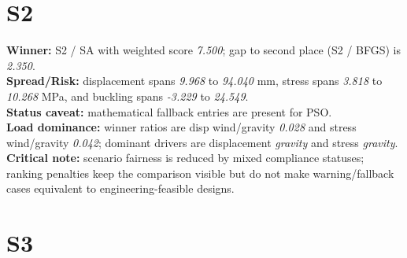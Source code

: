 \section{S2}


\begin{table}[H]
\centering
\scriptsize
\setlength{\tabcolsep}{4pt}
\renewcommand{\arraystretch}{1.1}
\end{table}


\begin{samepage}
\noindent \textbf{Winner:} S2 / SA with weighted score \textit{7.500}; gap to second place (S2 / BFGS) is \textit{2.350}.\\
\noindent \textbf{Spread/Risk:} displacement spans \textit{9.968} to \textit{94.040} mm, stress spans \textit{3.818} to \textit{10.268} MPa, and buckling spans \textit{-3.229} to \textit{24.549}.\\
\noindent \textbf{Status caveat:} mathematical fallback entries are present for PSO.\\
\noindent \textbf{Load dominance:} winner ratios are disp wind/gravity \textit{0.028} and stress wind/gravity \textit{0.042}; dominant drivers are displacement \textit{gravity} and stress \textit{gravity}.\\
\noindent \textbf{Critical note:} scenario fairness is reduced by mixed compliance statuses; ranking penalties keep the comparison visible but do not make warning/fallback cases equivalent to engineering-feasible designs.
\end{samepage}


\section{S3}


